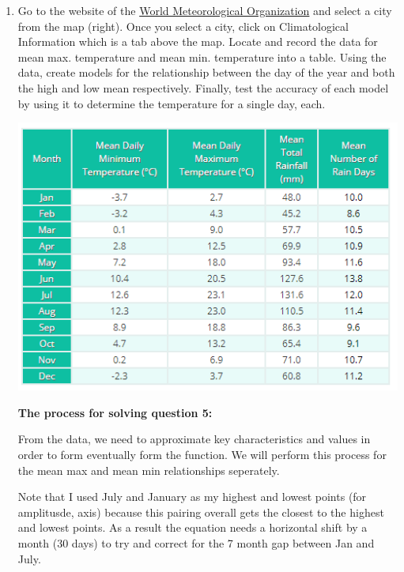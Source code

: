 \documentclass[12pt]{book}
\begin{document}
\begin{enumerate}
\item Go to the website of the \href{http://worldweather.wmo.int/}{World Meteorological Organization} and select a city from the map (right).
Once you select a city, click on Climatological Information which is a tab above the map. Locate and record the data for mean max. temperature and mean min. temperature into a table. Using the data, create models for the relationship between the day of the year and both the high and low mean respectively. Finally, test the accuracy of each model by using it to determine the temperature for a single day, each.

\begin{center}
    \includegraphics{mean minmax.PNG}
\end{center}

\vspace{0.3cm}
\textbf{The process for solving question 5:}

\vspace{0.3cm}
From the data, we need to approximate key characteristics and values in order to form 
eventually form the function. We will perform this process for the mean max and mean 
min relationships seperately.

\vspace{0.3cm}
Note that I used July and January as my highest and lowest points (for amplitusde, axis) 
because this pairing overall gets the closest to the highest and lowest points. As a result 
the equation needs a horizontal shift by a month (30 days) to try and correct for the 7 month 
gap between Jan and July.


\end{enumerate}
\end{document}
